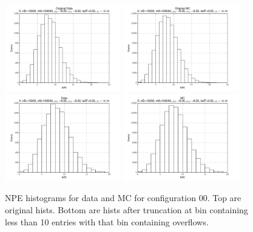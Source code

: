 \begin{figure}[htbp] \begin{center} 
\includegraphics[width=0.45\textwidth]{../FIGURES/00/FIG_Original_Data.pdf} 
\includegraphics[width=0.45\textwidth]{../FIGURES/00/FIG_Original_MC.pdf} 
\includegraphics[width=0.45\textwidth]{../FIGURES/00/FIG_Data.pdf} 
\includegraphics[width=0.45\textwidth]{../FIGURES/00/FIG_MC.pdf} 
\caption{NPE histograms for data and MC for configuration 00. Top are original hists. Bottom are hists after truncation at bin containing less than 10 entries with that bin containing overflows.} 
\label{tab:npe_00} 
\end{center} \end{figure} 

 
